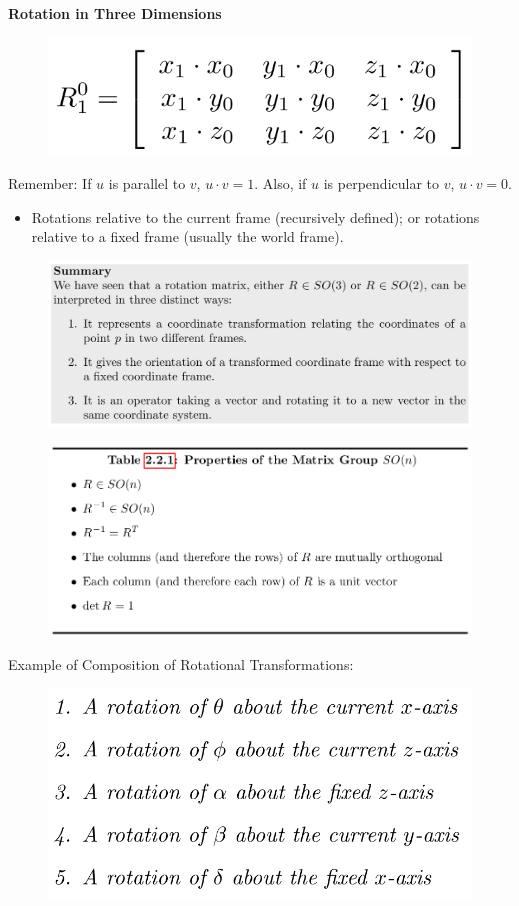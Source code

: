 \documentclass[a4paper,10pt,twocolumn]{article}
\begin{document}
\textbf{Rotation in Three Dimensions}

\begin{figure}[H]
\centering
 \includegraphics[width=0.6\linewidth]{rotation3d.png}
\end{figure}

Remember: If $u$ is parallel to $v$, $u \cdot v = 1$. Also, if $u$ is perpendicular to $v$, $u \cdot v = 0$.

\begin{itemize}
 \item Rotations relative to the current frame (recursively defined); or rotations relative to a fixed frame (usually the world frame).
\end{itemize}

\begin{figure}[H]
\centering
 \includegraphics[width=1\linewidth]{summaryRotation.png}
\end{figure}


\begin{figure}[H]
\centering
 \includegraphics[width=1\linewidth]{ch2-tables.png}
\end{figure}

Example of Composition of Rotational Transformations:
\begin{figure}[H]
\centering
 \includegraphics[width=.8\linewidth]{ex2_8.png}
\end{figure}
\end{document}
